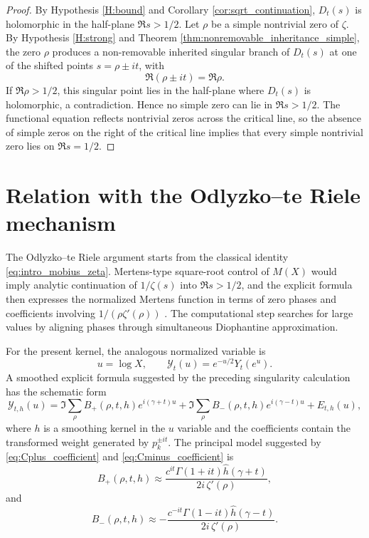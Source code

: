 \documentclass[11pt]{amsart}
\numberwithin{equation}{section}
\theoremstyle{plain}
\theoremstyle{definition}
\theoremstyle{remark}
\begin{document}
\begin{proof}
By Hypothesis \ref{H:bound} and Corollary \ref{cor:sqrt_continuation},
$D_t(s)$ is holomorphic in the half-plane $\Re s>1/2$.  Let $\rho$ be a
simple nontrivial zero of $\zeta$.  By Hypothesis \ref{H:strong} and
Theorem \ref{thm:nonremovable_inheritance_simple}, the zero $\rho$
produces a non-removable inherited singular branch of $D_t(s)$ at one of
the shifted points $s=\rho\pm it$, with
\begin{equation}
\Re(\rho\pm it)=\Re\rho.
\label{eq:conditional_link_real_parts}
\end{equation}
If $\Re\rho>1/2$, this singular point lies in the half-plane where
$D_t(s)$ is holomorphic, a contradiction.  Hence no simple zero can lie in
$\Re s>1/2$.  The functional equation reflects nontrivial zeros across the
critical line, so the absence of simple zeros on the right of the critical
line implies that every simple nontrivial zero lies on $\Re s=1/2$.
\end{proof}

\section{Relation with the Odlyzko--te Riele mechanism}
\label{sec:odlyzko_te_riele_relation}

The Odlyzko--te Riele argument starts from the classical identity
\eqref{eq:intro_mobius_zeta}.  Mertens-type square-root control of
$M(X)$ would imply analytic continuation of $1/\zeta(s)$ into
$\Re s>1/2$, and the explicit formula then expresses the normalized
Mertens function in terms of zero phases and coefficients involving
$1/(\rho\zeta'(\rho))$ \cite{OdlyzkoTeRiele1985}.
The computational step searches for large values by aligning phases
through simultaneous Diophantine approximation.

For the present kernel, the analogous normalized variable is
\begin{equation}
u=\log X,
\qquad
\mathcal Y_t(u)=e^{-u/2}Y_t(e^u).
\label{eq:normalized_log_variable}
\end{equation}
A smoothed explicit formula suggested by the preceding singularity
calculation has the schematic form
\begin{equation}
\mathcal Y_{t,h}(u)=
\Im\sum_{\rho}B_+(\rho,t,h)e^{i(\gamma+t)u}
+\Im\sum_{\rho}B_-(\rho,t,h)e^{i(\gamma-t)u}
+E_{t,h}(u),
\label{eq:smoothed_spectral_formula}
\end{equation}
where $h$ is a smoothing kernel in the $u$ variable and the coefficients
contain the transformed weight generated by $p_k^{\pm it}$.
The principal model suggested by \eqref{eq:Cplus_coefficient} and
\eqref{eq:Cminus_coefficient} is
\begin{equation}
B_+(\rho,t,h)\approx
\frac{c^{it}\Gamma(1+it)\widehat h(\gamma+t)}{2i\,\zeta'(\rho)},
\label{eq:Bplus_model}
\end{equation}
and
\begin{equation}
B_-(\rho,t,h)\approx
-\frac{c^{-it}\Gamma(1-it)\widehat h(\gamma-t)}{2i\,\zeta'(\rho)}.
\label{eq:Bminus_model}
\end{equation}
\end{document}

